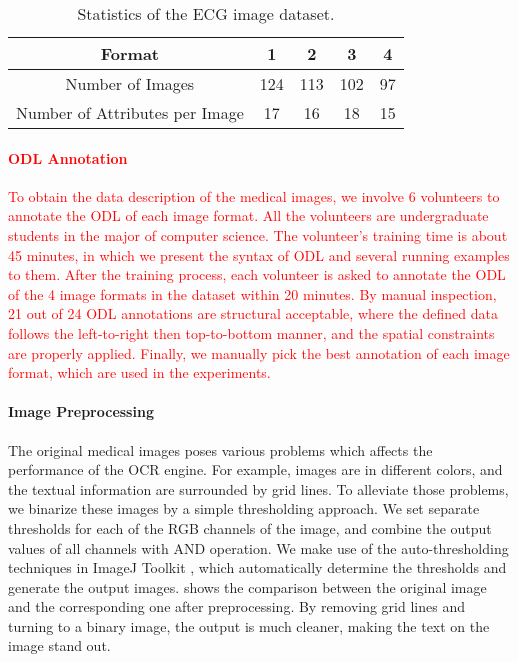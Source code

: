\begin{table}[ht]
\small
\centering
\caption{Statistics of the ECG image dataset.}
\label{tab:statis}
\begin{tabular}{|c|c|c|c|c|}
\hline
Format & 1 & 2 & 3 & 4\\
\hline \hline
Number of Images & 124 & 113 & 102 & 97\\
\hline
Number of Attributes per Image & 17 & 16 & 18 & 15 \\
\hline
\end{tabular}
\end{table}

\textcolor{red}{
\paragraph{ODL Annotation}
To obtain the data description of the medical images, we involve
6 volunteers to annotate the ODL of each image format.
All the volunteers are undergraduate students in the major of computer science.
The volunteer's training time is about 45 minutes, in which we present the
syntax of ODL and several running examples to them.
After the training process, each volunteer is asked to annotate the ODL of
the 4 image formats in the dataset within 20 minutes.
By manual inspection, 21 out of 24 ODL annotations are structural acceptable,
where the defined data follows the left-to-right then top-to-bottom manner,
and the spatial constraints are properly applied.
Finally, we manually pick the best annotation of each image format,
which are used in the experiments.
}

\paragraph{Image Preprocessing}
The original medical images poses various problems
which affects the performance of the OCR engine.
For example, images are in different colors,
and the textual information are surrounded by grid lines.
To alleviate those problems, we binarize these images
by a simple thresholding approach.
We set separate thresholds for each of the RGB channels of the image,
and combine the output values of all channels with AND operation.
We make use of the auto-thresholding techniques in ImageJ Toolkit \cite{schneider2012nih},
which automatically determine the thresholds and generate the output images.
 shows the comparison between the original image
and the corresponding one after preprocessing.
By removing grid lines and turning to a binary image,
the output is much cleaner, making the text on the image stand out.

